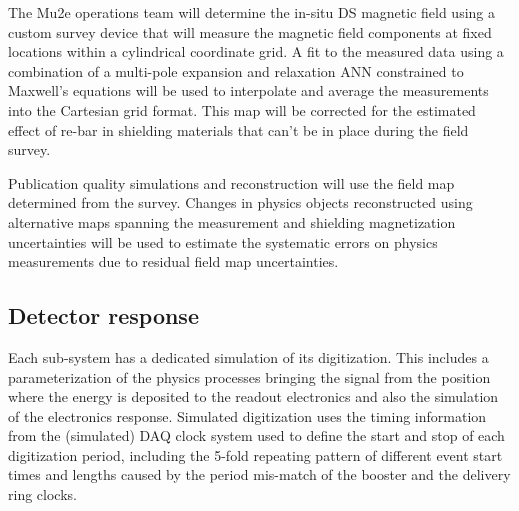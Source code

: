 The Mu2e operations team will determine the in-situ DS magnetic field using a custom survey device that will measure the magnetic field components at fixed locations within a cylindrical coordinate grid. A fit to the measured data using a combination of a multi-pole expansion and relaxation ANN constrained to Maxwell's equations will be used to interpolate and average the measurements into the Cartesian grid format. This map will be corrected for the estimated effect of re-bar in shielding materials that can't be in place during the field survey.

Publication quality simulations and reconstruction will use the field map determined from the survey. Changes in physics objects reconstructed using alternative maps spanning the measurement and shielding magnetization uncertainties will be used to estimate the systematic errors on physics measurements due to residual field map uncertainties.


\subsection{Detector response}
Each sub-system has a dedicated simulation of its digitization. This includes a parameterization of the physics processes bringing the signal from the position where the energy is deposited to the readout electronics and also the simulation of the electronics response. Simulated digitization uses the timing information from the (simulated) DAQ clock system used to define the start and stop of each digitization period, including the 5-fold repeating pattern of different event start times and lengths caused by the period mis-match of the booster and the delivery ring clocks.


